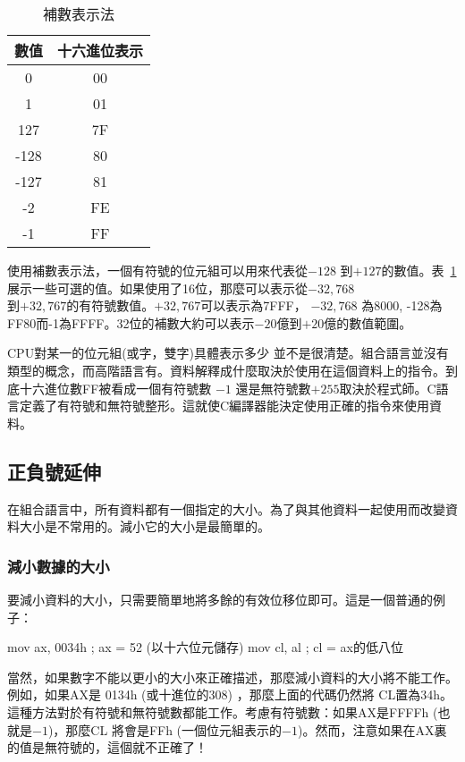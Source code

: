 \begin{table}
\centering
\begin{tabular}{||c|c||}
\hline
數值 & 十六進位表示 \\
\hline
0 & 00 \\
1 & 01 \\
127 & 7F \\
-128 & 80 \\
-127 & 81 \\
-2 & FE \\
-1 & FF \\
\hline
\end{tabular}
\caption{補數表示法 \label{tab:twocomp}}
\end{table}

使用補數表示法，一個有符號的位元組可以用來代表從$-128$
到$+127$的數值。表~\ref{tab:twocomp}
展示一些可選的值。如果使用了16位，那麼可以表示從$-32,768$\\
到$+32,767$的有符號數值。$+32,767$可以表示為7FFF， $-32,768$ 為8000,
-128為FF80而-1為FFFF。32位的補數大約可以表示$-20$億到$+20$億的數值範圍。


CPU對某一的位元組(或字，雙字)具體表示多少
並不是很清楚。組合語言並沒有類型的概念，而高階語言有。資料解釋成什麼取決於使用在這個資料上的指令。到底十六進位數FF被看成一個有符號數
$-1$
還是無符號數$+255$取決於程式師。C語言定義了有符號和無符號整形。這就使C編譯器能決定使用正確的指令來使用資料。

  

\subsection{正負號延伸 }

在組合語言中，所有資料都有一個指定的大小。為了與其他資料一起使用而改變資料大小是不常用的。減小它的大小是最簡單的。

\subsubsection{減小數據的大小}

要減小資料的大小，只需要簡單地將多餘的有效位移位即可。這是一個普通的例子：
\begin{AsmCodeListing}[numbers=none,frame=none]
      mov    ax, 0034h      ; ax = 52 (以十六位元儲存)
      mov    cl, al         ; cl = ax的低八位
\end{AsmCodeListing}

當然，如果數字不能以更小的大小來正確描述，那麼減小資料的大小將不能工作。例如，如果{\code AX}是
0134h (或十進位的308) ，那麼上面的代碼仍然將
{\code CL}置為34h。這種方法對於有符號和無符號數都能工作。考慮有符號數：如果{\code AX}是FFFFh (也就是$-1$)，那麼{\code CL} 將會是FFh (一個位元組表示的$-1$)。然而，注意如果在{\code AX}裏的值是無符號的，這個就不正確了！

